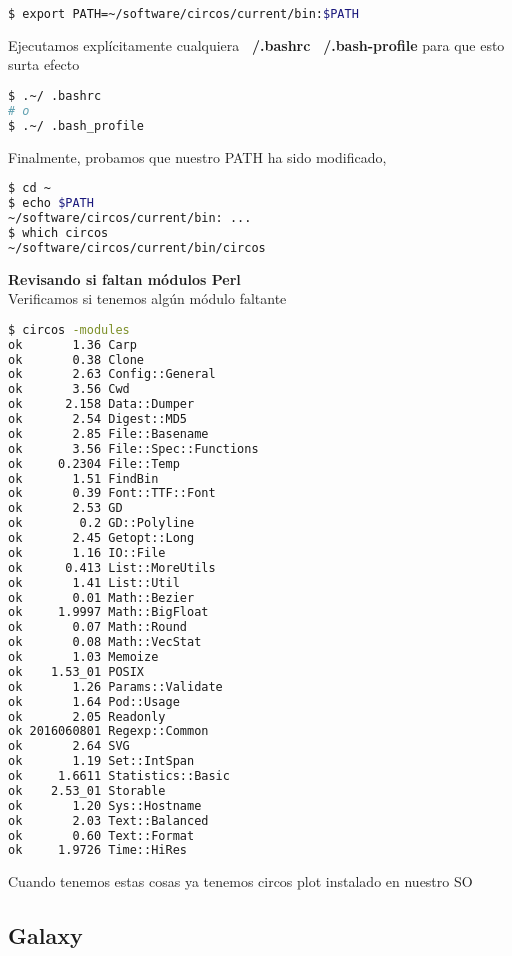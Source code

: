 \documentclass[12pt,letterpaper]{article}
\begin{document}
\begin{lstlisting}[language=bash, style=consola]
$ export PATH=~/software/circos/current/bin:$PATH
\end{lstlisting}

Ejecutamos explícitamente cualquiera \textbf{~/.bashrc} \textbf{~/.bash-profile} para que esto surta efecto\\
\begin{lstlisting}[language=bash, style=consola]
$ .~/ .bashrc
# o 
$ .~/ .bash_profile
\end{lstlisting}

Finalmente, probamos que nuestro PATH ha sido modificado,\\

\begin{lstlisting}[language=bash, style=consola]
$ cd ~
$ echo $PATH
~/software/circos/current/bin: ...
$ which circos
~/software/circos/current/bin/circos
\end{lstlisting}
\textbf{Revisando si faltan módulos Perl}\\

Verificamos si tenemos algún módulo faltante\\

\begin{lstlisting}[language=bash, style=consola]
$ circos -modules
ok       1.36 Carp
ok       0.38 Clone
ok       2.63 Config::General
ok       3.56 Cwd
ok      2.158 Data::Dumper
ok       2.54 Digest::MD5
ok       2.85 File::Basename
ok       3.56 File::Spec::Functions
ok     0.2304 File::Temp
ok       1.51 FindBin
ok       0.39 Font::TTF::Font
ok       2.53 GD
ok        0.2 GD::Polyline
ok       2.45 Getopt::Long
ok       1.16 IO::File
ok      0.413 List::MoreUtils
ok       1.41 List::Util
ok       0.01 Math::Bezier
ok     1.9997 Math::BigFloat
ok       0.07 Math::Round
ok       0.08 Math::VecStat
ok       1.03 Memoize
ok    1.53_01 POSIX
ok       1.26 Params::Validate
ok       1.64 Pod::Usage
ok       2.05 Readonly
ok 2016060801 Regexp::Common
ok       2.64 SVG
ok       1.19 Set::IntSpan
ok     1.6611 Statistics::Basic
ok    2.53_01 Storable
ok       1.20 Sys::Hostname
ok       2.03 Text::Balanced
ok       0.60 Text::Format
ok     1.9726 Time::HiRes

\end{lstlisting}

Cuando tenemos estas cosas ya tenemos circos plot instalado en nuestro SO

\subsection{Galaxy}
\end{document}
